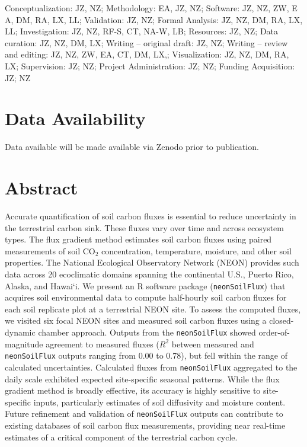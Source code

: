 \documentclass[
  letterpaper,
  DIV=11,
  numbers=noendperiod]{scrartcl}
\begin{document}
Conceptualization: JZ, NZ; Methodology: EA, JZ, NZ; Software: JZ, NZ,
ZW, E A, DM, RA, LX, LL; Validation: JZ, NZ; Formal Analysis: JZ, NZ,
DM, RA, LX, LL; Investigation: JZ, NZ, RF-S, CT, NA-W, LB; Resources:
JZ, NZ; Data curation: JZ, NZ, DM, LX; Writing -- original draft: JZ,
NZ; Writing -- review and editing: JZ, NZ, ZW, EA, CT, DM, LX,;
Visualization: JZ, NZ, DM, RA, LX; Supervision: JZ; NZ; Project
Administration: JZ; NZ; Funding Acquisition: JZ; NZ

\section*{Data Availability}\label{data-availability}

Data available will be made available via Zenodo prior to publication.

\newpage

\section{Abstract}\label{abstract}

Accurate quantification of soil carbon fluxes is essential to reduce
uncertainty in the terrestrial carbon sink. These fluxes vary over time
and across ecosystem types. The flux gradient method estimates soil
carbon fluxes using paired measurements of soil CO\(_{2}\)
concentration, temperature, moisture, and other soil properties. The
National Ecological Observatory Network (NEON) provides such data across
20 ecoclimatic domains spanning the continental U.S., Puerto Rico,
Alaska, and Hawai`i. We present an R software package
(\texttt{neonSoilFlux}) that acquires soil environmental data to compute
half-hourly soil carbon fluxes for each soil replicate plot at a
terrestrial NEON site. To assess the computed fluxes, we visited six
focal NEON sites and measured soil carbon fluxes using a closed-dynamic
chamber approach. Outputs from the \texttt{neonSoilFlux} showed
order-of-magnitude agreement to measured fluxes (\(R^{2}\) between
measured and \texttt{neonSoilFlux} outputs ranging from 0.00 to 0.78),
but fell within the range of calculated uncertainties. Calculated fluxes
from \texttt{neonSoilFlux} aggregated to the daily scale exhibited
expected site-specific seasonal patterns. While the flux gradient method
is broadly effective, its accuracy is highly sensitive to site-specific
inputs, particularly estimates of soil diffusivity and moisture content.
Future refinement and validation of \texttt{neonSoilFlux} outputs can
contribute to existing databases of soil carbon flux measurements,
providing near real-time estimates of a critical component of the
terrestrial carbon cycle.
\end{document}
